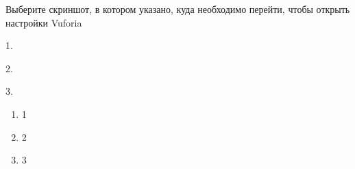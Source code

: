 
Выберите скриншот, в котором указано, куда необходимо перейти, чтобы открыть настройки Vuforia

1.


2.


3.


\begin{enumerate}
    \item 1
    \item 2
    \item 3
\end{enumerate}

